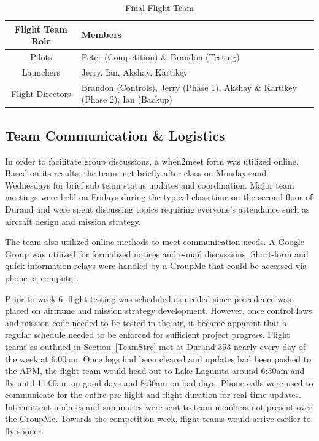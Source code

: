 \documentclass[11pt]{article}
\begin{document}
		\begin{table}[!ht]
			\begin{center}
				\begin{tabular}{| c | p{7cm} |}
					\hline
					\textbf{Flight Team Role} & \textbf{Members} \\ \hline
					Pilots & Peter (Competition) \& Brandon (Testing) \\ \hline
					Launchers & Jerry, Ian, Akshay, Kartikey \\ \hline
					Flight Directors & Brandon (Controls), Jerry (Phase 1), Akshay \& Kartikey (Phase 2), Ian (Backup) \\ \hline
				\end{tabular}
				\caption{Final Flight Team}
				\label{finalFltTeam}
			\end{center}
		\end{table}

		\subsection{Team Communication \& Logistics}
		\label{TeamCommLog}
		In order to facilitate group discussions, a when2meet form was utilized online. Based on its results, the team met briefly after class on Mondays and Wednesdays for brief sub team status updates and coordination. Major team meetings were held on Fridays during the typical class time on the second floor of Durand and were spent discussing topics requiring everyone's attendance such as aircraft design and mission strategy.

		The team also utilized online methods to meet communication needs. A Google Group was utilized for formalized notices and e-mail discussions. Short-form and quick information relays were handled by a GroupMe that could be accessed via phone or computer. 

		Prior to week 6, flight testing was scheduled as needed since precedence was placed on airframe and mission strategy development. However, once control laws and mission code needed to be tested in the air, it became apparent that a regular schedule needed to be enforced for sufficient project progress. Flight teams as outlined in Section~\ref{TeamStrc} met at Durand 353 nearly every day of the week at 6:00am. Once logs had been cleared and updates had been pushed to the APM, the flight team would head out to Lake Lagunita around 6:30am and fly until 11:00am on good days and 8:30am on bad days. Phone calls were used to communicate for the entire pre-flight and flight duration for real-time updates. Intermittent updates and summaries were sent to team members not present over the GroupMe. Towards the competition week, flight teams would arrive earlier to fly sooner.
\end{document}
